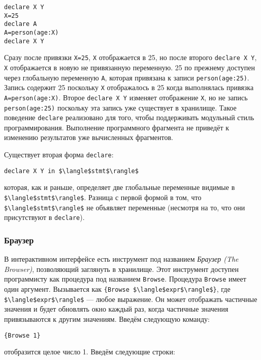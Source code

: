 \begin{lstlisting}
declare X Y
X=25
declare A
A=person(age:X)
declare X Y
\end{lstlisting}

Сразу после привязки \lstinline|X=25|, \lstinline|X| отображается в 25, но после второго \lstinline|declare X Y|, \lstinline|X| отображается в новую не привязанную переменную. 25 по прежнему доступен через глобальную переменную \lstinline|A|, которая привязана к записи \lstinline|person(age:25)|. Запись содержит 25 поскольку \lstinline|X| отображалось в 25 когда выполнялась привязка \lstinline|A=person(age:X)|. Второе \lstinline|declare X Y| изменяет отображение \lstinline|X|, но не запись \lstinline|person(age:25)| поскольку эта запись уже существует в хранилище. Такое поведение \lstinline|declare| реализовано для того, чтобы поддерживать модульный стиль программирования. Выполнение программного фрагмента не приведёт к изменению результатов уже вычисленных фрагментов.

Существует вторая форма \lstinline|declare|:

\begin{lstlisting}
declare X Y in $\langle$stmt$\rangle$
\end{lstlisting}

которая, как и раньше, определяет две глобальные переменные видимые в \lstinline|$\langle$stmt$\rangle$|. Разница с первой формой в том, что \lstinline|$\langle$stmt$\rangle$| не объявляет переменные (несмотря на то, что они присутствуют в \lstinline|declare|).

\subsubsection{Браузер}

В интерактивном интерфейсе есть инструмент под названием \emph{Браузер (The Browser)}, позволяющий заглянуть в хранилище. Этот инструмент доступен программисту как процедура под названием \lstinline|Browse|. Процедура \lstinline|Browse| имеет один аргумент. Вызывается как \lstinline|{Browse $\langle$expr$\rangle$}|, где \lstinline|$\langle$expr$\rangle$| --- любое выражение. Он может отображать частичные значения и будет обновлять окно каждый раз, когда частичные значения привязываются к другим значениям. Введём следующую команду:

\begin{lstlisting}
{Browse 1}
\end{lstlisting}

отобразится целое число 1. Введём следующие строки:

